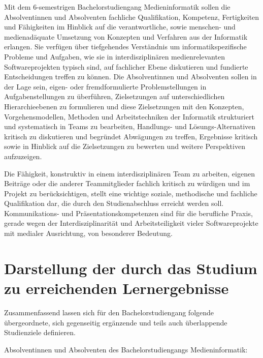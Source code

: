 Mit dem 6-semestrigen Bachelorstudiengang Medieninformatik sollen die
Absolventinnen und Absolventen fachliche Qualifikation, Kompetenz,
Fertigkeiten und Fähigkeiten im Hinblick auf die verantwortliche, sowie
menschen- und medienadäquate Umsetzung von Konzepten und Verfahren aus
der Informatik erlangen. Sie verfügen über tiefgehendes Verständnis um
informatikspezifische Probleme und Aufgaben, wie sie in
interdisziplinären medienrelevanten Softwareprojekten typisch sind, auf
fachlicher Ebene diskutieren und fundierte Entscheidungen treffen zu
können. Die Absolventinnen und Absolventen sollen in der Lage sein,
eigen- oder fremdformulierte Problemstellungen in Aufgabenstellungen zu
überführen, Zielsetzungen auf unterschiedlichen Hierarchieebenen zu
formulieren und diese Zielsetzungen mit den Konzepten,
Vorgehensmodellen, Methoden und Arbeitstechniken der Informatik
strukturiert und systematisch in Teams zu bearbeiten, Handlungs- und
Lösungs-Alternativen kritisch zu diskutieren und begründet Abwägungen zu
treffen, Ergebnisse kritisch sowie in Hinblick auf die Zielsetzungen zu
bewerten und weitere Perspektiven aufzuzeigen.

Die Fähigkeit, konstruktiv in einem interdisziplinären Team zu arbeiten,
eigenen Beiträge oder die anderer Teammitglieder fachlich kritisch zu
würdigen und im Projekt zu berücksichtigen, stellt eine wichtige
soziale, methodische und fachliche Qualifikation dar, die durch den
Studienabschluss erreicht werden soll. Kommunikations- und
Präsentationskompetenzen sind für die berufliche Praxis, gerade wegen
der Interdisziplinarität und Arbeitsteiligkeit vieler Softwareprojekte
mit medialer Ausrichtung, von besonderer Bedeutung.

\section{Darstellung der durch das Studium zu erreichenden
Lernergebnisse}\label{darstellung-der-durch-das-studium-zu-erreichenden-lernergebnisse}

Zusammenfassend lassen sich für den Bachelorstudiengang folgende
übergeordnete, sich gegenseitig ergänzende und teils auch überlappende
Studienziele definieren.

Absolventinnen und Absolventen des Bachelorstudiengangs
Medieninformatik:


